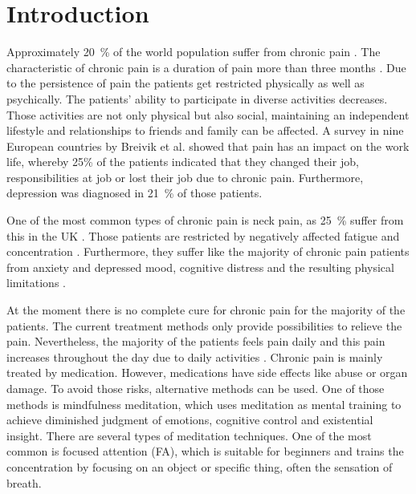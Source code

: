 \section{Introduction}
Approximately 20~\% of the world population suffer from chronic pain \cite{Macfarlanea2016}. The characteristic of chronic pain is a duration of pain more than three months \cite{Mello2016}. Due to the persistence of pain the patients get restricted physically as well as psychically. The patients’ ability to participate in diverse activities decreases. Those activities are not only physical but also social, maintaining an independent lifestyle and relationships to friends and family can be affected. A survey in nine European countries by Breivik et al. \cite{Breivik2006} showed that pain has an impact on the work life, whereby 25\% of the patients indicated that they changed their job, responsibilities at job or lost their job due to chronic pain. Furthermore, depression was diagnosed in 21~\% of those patients. \cite{Breivik2006} 

One of the most common types of chronic pain is neck pain, as 25~\% suffer from this in the UK \cite{Macfarlanea2016}. Those patients are restricted by negatively affected fatigue and concentration \cite{vanRanderaat2016}. Furthermore, they suffer like the majority of chronic pain patients from anxiety and depressed mood, cognitive distress and the resulting physical limitations \cite{Gross2013}. 

At the moment there is no complete cure for chronic pain for the majority of the patients. The current treatment methods only provide possibilities to relieve the pain. \cite{Pope2017,marcus2009} Nevertheless, the majority of the patients feels pain daily and this pain increases throughout the day due to daily activities \cite{Breivik2006}. 
Chronic pain is mainly treated by medication. However, medications have side effects like abuse or organ damage. To avoid those risks, alternative methods can be used. \cite{Pope2017,marcus2009, stein2007} One of those methods is mindfulness meditation, which uses meditation as mental training to achieve diminished judgment of emotions, cognitive control and existential insight. There are several types of meditation techniques. One of the most common is  focused attention (FA), which is suitable for beginners and trains the concentration by focusing on an object or specific thing, often the sensation of breath. \cite{Zeidan2016, Kabat1982}

